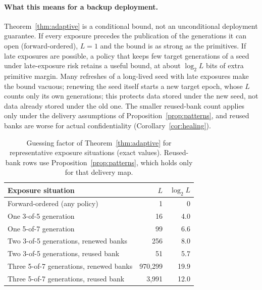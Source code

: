 \documentclass[pdflatex,sn-mathphys-num]{sn-jnl}%
\theoremstyle{plain}
\theoremstyle{definition}
\begin{document}
\paragraph{What this means for a backup deployment.}
Theorem~\ref{thm:adaptive} is a conditional bound, not an unconditional deployment guarantee. If every exposure precedes the publication of the generations it can open (forward-ordered), $L=1$ and the bound is as strong as the primitives. If late exposures are possible, a policy that keeps few target generations of a seed under late-exposure risk retains a useful bound, at about $\log_2L$ bits of extra primitive margin. Many refreshes of a long-lived seed with late exposures make the bound vacuous; renewing the seed itself starts a new target epoch, whose $L$ counts only its own generations; this protects data stored under the new seed, not data already stored under the old one. The smaller reused-bank count applies only under the delivery assumptions of Proposition~\ref{prop:patterns}, and reused banks are worse for actual confidentiality (Corollary~\ref{cor:healing}).

\begin{table}[htbp]
\caption{Guessing factor of Theorem~\ref{thm:adaptive} for representative exposure situations (exact values). Reused-bank rows use Proposition~\ref{prop:patterns}, which holds only for that delivery map.}\label{tab:guess}
\centering\footnotesize
\begin{tabularx}{\linewidth}{@{}>{\raggedright\arraybackslash}Xrr@{}}\toprule
Exposure situation & $L$ & $\log_2L$\\\midrule
Forward-ordered (any policy) & 1 & 0\\
One 3-of-5 generation & 16 & 4.0\\
One 5-of-7 generation & 99 & 6.6\\
Two 3-of-5 generations, renewed banks & 256 & 8.0\\
Two 3-of-5 generations, reused bank & 51 & 5.7\\
Three 5-of-7 generations, renewed banks & 970,299 & 19.9\\
Three 5-of-7 generations, reused bank & 3,991 & 12.0\\\bottomrule
\end{tabularx}
\end{table}
\end{document}
